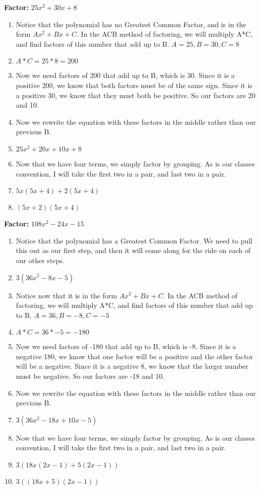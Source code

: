 \documentclass{article}
\begin{document}
\textbf{Factor:} $25x^{2} + 30x + 8$
\begin{enumerate}
  \item Notice that the polynomial has no Greatest Common Factor, and is in the form $Ax^{2} + Bx + C$. In the ACB method of factoring, we will multiply A*C, and find factors of this number that add up to B. $A=25, B=30, C=8$
  \item[] $A*C = 25*8 = 200$
  \item Now we need factors of 200 that add up to B, which is 30. Since it is a positive 200, we know that both factors must be of the same sign. Since it is a positive 30, we know that they must both be positive. So our factors are 20 and 10.
  \item Now we rewrite the equation with these factors in the middle rather than our previous B.
  \item[] $25x^{2} + 20x + 10x +8$
  \item Now that we have four terms, we simply factor by grouping. As is our classes convention, I will take the first two in a pair, and last two in a pair.
  \item[] $5x(5x+4) + 2(5x+4)$
  \item[] $(5x+2)(5x+4)$
\end{enumerate}
\textbf{Factor:} $108x^{2} - 24x - 15$
\begin{enumerate}
  \item Notice that the polynomial has a Greatest Common Factor. We need to pull this out as our first step, and then it will come along for the ride on each of our other steps.
  \item [] $3(36x^{2} - 8x - 5)$
  \item Notice now that it is in the form $Ax^{2} + Bx + C$. In the ACB method of factoring, we will multiply A*C, and find factors of this number that add up to B. $A=36, B=-8, C=-5$
  \item[] $A*C = 36*-5 = -180$
  \item Now we need factors of -180 that add up to B, which is -8. Since it is a negative 180, we know that one factor will be a positive and the other factor will be a negative. Since it is a negative 8, we know that the larger number must be negative. So our factors are -18 and 10.
  \item Now we rewrite the equation with these factors in the middle rather than our previous B.
  \item[] $3( 36x^{2} - 18x + 10x - 5 )$
  \item Now that we have four terms, we simply factor by grouping. As is our classes convention, I will take the first two in a pair, and last two in a pair.
  \item[] $3( 18x(2x-1) +5(2x-1) )$
  \item[] $3((18x+5)(2x-1))$
\end{enumerate}
\end{document}
